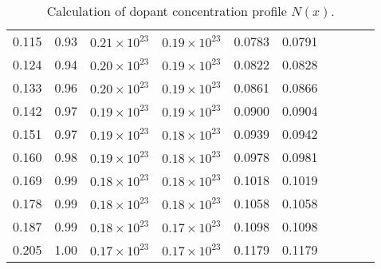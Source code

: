 \begin{table}[h!]
\begin{minipage}[c]{\myfiguresize}
\begin{center}
\begin{tabular}{c c c c c c c c c c}
        0.115 & 0.93 & $0.21\times10^{23}$ & $0.19\times10^{23}$ & 0.0783 & 0.0791 \\
        0.124 & 0.94 & $0.20\times10^{23}$ & $0.19\times10^{23}$ & 0.0822 & 0.0828 \\
        0.133 & 0.96 & $0.20\times10^{23}$ & $0.19\times10^{23}$ & 0.0861 & 0.0866 \\
        0.142 & 0.97 & $0.19\times10^{23}$ & $0.19\times10^{23}$ & 0.0900 & 0.0904 \\
        0.151 & 0.97 & $0.19\times10^{23}$ & $0.18\times10^{23}$ & 0.0939 & 0.0942 \\
        0.160 & 0.98 & $0.19\times10^{23}$ & $0.18\times10^{23}$ & 0.0978 & 0.0981 \\
        0.169 & 0.99 & $0.18\times10^{23}$ & $0.18\times10^{23}$ & 0.1018 & 0.1019 \\
        0.178 & 0.99 & $0.18\times10^{23}$ & $0.18\times10^{23}$ & 0.1058 & 0.1058 \\
        0.187 & 0.99 & $0.18\times10^{23}$ & $0.17\times10^{23}$ & 0.1098 & 0.1098 \\
        0.205 & 1.00 & $0.17\times10^{23}$ & $0.17\times10^{23}$ & 0.1179 & 0.1179 \\
      \end{tabular}
      \caption[Calculation of dopant concentration profile
        $N(x)$]{Calculation of dopant concentration profile
        $N(x)$.}\label{tab:4.1}
    \end{center}
  \end{minipage}
\end{table}

